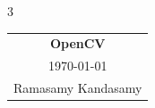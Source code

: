 



\raggedright
\footnotesize
\begin{multicols*}{3}
\setlength{\premulticols}{1pt}
\setlength{\postmulticols}{1pt}
\setlength{\multicolsep}{1pt}
\setlength{\columnsep}{2pt}

\begin{center}
\begin{tabular}{c}
\LARGE{\textbf{OpenCV}}\\
\today\\
Ramasamy Kandasamy\\
\end{tabular}
\end{center}




\end{multicols*}
